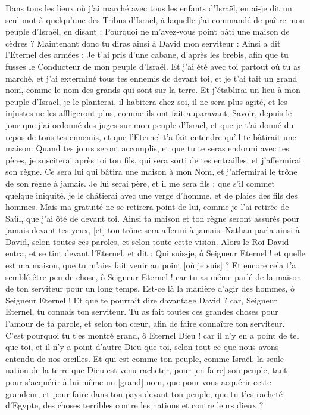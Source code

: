 \begin{multicols}{2}
Dans tous les lieux où j'ai marché avec tous les enfants d'Israël, en ai-je dit un seul mot à quelqu'une des Tribus d'Israël, à laquelle j'ai commandé de paître mon peuple d'Israël, en disant : Pourquoi ne m'avez-vous point bâti une maison de cèdres ?
Maintenant donc tu diras ainsi à David mon serviteur : Ainsi a dit l'Eternel des armées : Je t'ai pris d'une cabane, d'après les brebis, afin que tu fusses le Conducteur de mon peuple d'Israël.
Et j'ai été avec toi partout où tu as marché, et j'ai exterminé tous tes ennemis de devant toi, et je t'ai tait un grand nom, comme le nom des grands qui sont sur la terre.
Et j'établirai un lieu à mon peuple d'Israël, je le planterai, il habitera chez soi, il ne sera plus agité, et les injustes ne les affligeront plus, comme ils ont fait auparavant,
Savoir, depuis le jour que j'ai ordonné des juges sur mon peuple d'Israël, et que je t'ai donné du repos de tous tes ennemis, et que l'Eternel t'a fait entendre qu'il te bâtirait une maison.
Quand tes jours seront accomplis, et que tu te seras endormi avec tes pères, je susciterai après toi ton fils, qui sera sorti de tes entrailles, et j'affermirai son règne.
Ce sera lui qui bâtira une maison à mon Nom, et j'affermirai le trône de son règne à jamais.
Je lui serai père, et il me sera fils ; que s'il commet quelque iniquité, je le châtierai avec une verge d'homme, et de plaies des fils des hommes.
Mais ma gratuité ne se retirera point de lui, comme je l'ai retirée de Saül, que j'ai ôté de devant toi.
Ainsi ta maison et ton règne seront assurés pour jamais devant tes yeux, [et] ton trône sera affermi à jamais.
Nathan parla ainsi à David, selon toutes ces paroles, et selon toute cette vision.
Alors le Roi David entra, et se tint devant l'Eternel, et dit : Qui suis-je, ô Seigneur Eternel ! et quelle est ma maison, que tu m'aies fait venir au point [où je suis] ?
Et encore cela t'a semblé être peu de chose, ô Seigneur Eternel ! car tu as même parlé de la maison de ton serviteur pour un long temps. Est-ce là la manière d'agir des hommes, ô Seigneur Eternel !
Et que te pourrait dire davantage David ? car, Seigneur Eternel, tu connais ton serviteur.
Tu as fait toutes ces grandes choses pour l'amour de ta parole, et selon ton cœur, afin de faire connaître ton serviteur.
C'est pourquoi tu t'es montré grand, ô Eternel Dieu ! car il n'y en a point de tel que toi, et il n'y a point d'autre Dieu que toi, selon tout ce que nous avons entendu de nos oreilles.
Et qui est comme ton peuple, comme Israël, la seule nation de la terre que Dieu est venu racheter, pour [en faire] son peuple, tant pour s'acquérir à lui-même un [grand] nom, que pour vous acquérir cette grandeur, et pour faire dans ton pays devant ton peuple, que tu t'es racheté d'Egypte, des choses terribles contre les nations et contre leurs dieux ?

\end{multicols}
